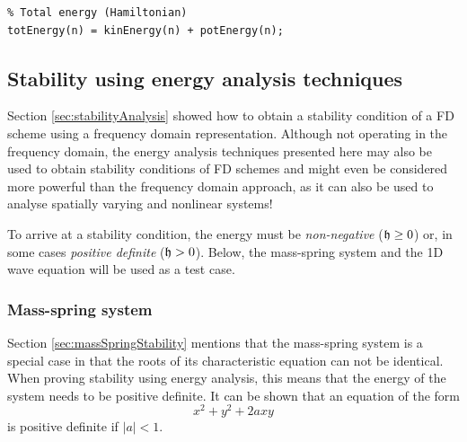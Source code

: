 {{\begin{lstlisting}
% Total energy (Hamiltonian)
totEnergy(n) = kinEnergy(n) + potEnergy(n);
\end{lstlisting}


\subsection{Stability using energy analysis techniques}\label{sec:stabilityAnalysisEnergy}
Section \ref{sec:stabilityAnalysis} showed how to obtain a stability condition of a FD scheme using a frequency domain representation. Although not operating in the frequency domain, the energy analysis techniques presented here may also be used to obtain stability conditions of FD schemes and might even be considered more powerful than the frequency domain approach, as it can also be used to analyse spatially varying and nonlinear systems!

To arrive at a stability condition, the energy must be \textit{non-negative} ($\mathfrak{h} \geq 0$) or, in some cases \textit{positive definite} ($\mathfrak{h} > 0$). Below, the mass-spring system and the 1D wave equation will be used as a test case.

\subsubsection{Mass-spring system}
Section \ref{sec:massSpringStability} mentions that the mass-spring system is a special case in that the roots of its characteristic equation can not be identical. When proving stability using energy analysis, this means that the energy of the system needs to be positive definite. It can be shown that an equation of the form 
\begin{equation}\label{eq:quadraticForm}
    x^2 + y^2  + 2axy
\end{equation} 
is positive definite if $|a| < 1$.%

}}
